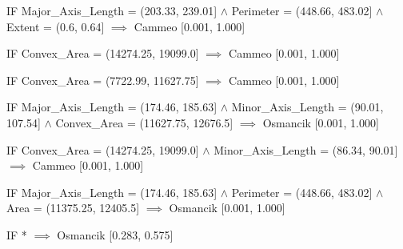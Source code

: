 IF Major_Axis_Length = (203.33, 239.01] $\land$ Perimeter = (448.66, 483.02] $\land$ Extent = (0.6, 0.64] $\implies$ Cammeo [0.001, 1.000]

IF Convex_Area = (14274.25, 19099.0] $\implies$ Cammeo [0.001, 1.000]

IF Convex_Area = (7722.99, 11627.75] $\implies$ Cammeo [0.001, 1.000]

IF Major_Axis_Length = (174.46, 185.63] $\land$ Minor_Axis_Length = (90.01, 107.54] $\land$ Convex_Area = (11627.75, 12676.5] $\implies$ Osmancik [0.001, 1.000]

IF Convex_Area = (14274.25, 19099.0] $\land$ Minor_Axis_Length = (86.34, 90.01] $\implies$ Cammeo [0.001, 1.000]

IF Major_Axis_Length = (174.46, 185.63] $\land$ Perimeter = (448.66, 483.02] $\land$ Area = (11375.25, 12405.5] $\implies$ Osmancik [0.001, 1.000]

IF * $\implies$ Osmancik [0.283, 0.575]
